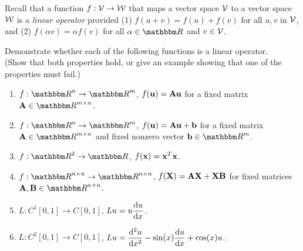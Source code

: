 
Recall that a function $f: {\cal V} \to {\cal W}$ that maps a vector space ${\cal V}$ to
a vector space ${\cal W}$ is a \emph{linear operator}
provided (1) $f(u+v) = f(u)+f(v)$ for all $u, v$ in ${\cal V}$,
and (2) $f(\alpha v) = \alpha f(v)$ for all $\alpha\in \R$ and $v\in{\cal V}$.

Demonstrate whether each of the following functions is a linear operator.\\
(Show that both properties hold, or give an example showing that one 
of the properties must fail.)

\begin{enumerate}
\item $f:\R^n\to \R^m$, $f({\bf u}) = {\bf A} {\bf u}$ for a fixed matrix $\BA\in\Rmn$.
\item $f:\R^n\to \R^m$, $f({\bf u}) = {\bf A} {\bf u} + {\bf b}$ for a fixed matrix $\BA\in\Rmn$ 
       and fixed nonzero vector $\Bb\in\Rm$.
\item $f:\R^2 \to \R$,  $f({\bf x}) = {\bf x}^T {\bf x}$.
\item $f:\Rnn\to \Rnn$, $f({\bf X}) = {\bf A}{\bf X} + {\bf X}{\bf B}$ for fixed matrices $\BA, \BB\in\Rnn$.
\item $L: C^1[0,1] \to C[0,1]$, ${\displaystyle{ Lu = u {{\rm d}u \over {\rm d}x}}}$.
\item $L: C^2[0,1] \to C[0,1]$, ${\displaystyle{ Lu = {{\rm d}^2 u \over {\rm d}x^2} - \sin(x) {{\rm d}u \over {\rm d}x} + \cos(x) u}}$.

\end{enumerate}


